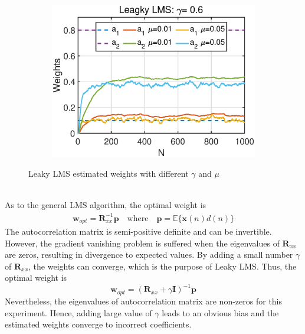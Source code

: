 \begin{figure}[htb]
\begin{subfigure}[b]{0.33\textwidth}
     \end{subfigure}
      \hspace{-0.4cm}
     \begin{subfigure}[b]{0.33\textwidth}
         \centering
         \includegraphics[width=\textwidth]{fig/21/21f3.eps}
     \end{subfigure}
        \caption{Leaky LMS estimated weights with different $\gamma$ and $\mu$}
        \label{fig:2_1_f}
\end{figure}\\
As to the general LMS algorithm, the optimal weight is
\begin{align}
 \mathbf {w}_{opt}=\mathbf{R}_{xx}^{-1} \mathbf{p}\quad \text{where} \quad \mathbf{p}= \mathbb{E}\{\mathbf{x}(n)d(n)\}
\end{align}
The autocorrelation matrix is semi-positive definite and can be invertible. However, the gradient vanishing problem is suffered when the eigenvalues of $\mathbf{R}_{xx}$ are zeros, resulting in divergence to expected values. By adding a small number $\gamma$ of $\mathbf{R}_{xx}$, the weights can converge, which is the purpose of Leaky LMS. Thus, the optimal weight is 
\begin{equation}
 \mathbf {w}_{opt}=(\mathbf{R}_{xx}+\gamma \mathbf{I})^{-1} \mathbf{p}
\end{equation}
Nevertheless, the eigenvalues of autocorrelation matrix are non-zeros for this experiment. Hence, adding large value of $\gamma$ leads to an obvious bias and the estimated weights converge to incorrect coefficients. 



